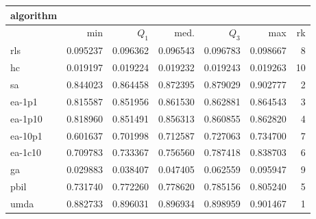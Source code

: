\begin{tabular}{@{}l*{5}{>{{}}N{1}{3}}>{{}}N{2}{0}@{}}
\toprule
{algorithm} &  \\
\midrule
& {min} & {$Q_1$} & {med.} & {$Q_3$} & {max} & {rk}\\
\midrule
rls & 0.095237 & 0.096362 & 0.096543 & 0.096783 & 0.098667 & 8\\
hc & 0.019197 & 0.019224 & 0.019232 & 0.019243 & 0.019263 & 10\\
sa & 0.844023 & 0.864458 & 0.872395 & 0.879029 & {\color{blue}} 0.902777 & 2\\
ea-1p1 & 0.815587 & 0.851956 & 0.861530 & 0.862881 & 0.864543 & 3\\
ea-1p10 & 0.818960 & 0.851491 & 0.856313 & 0.860855 & 0.862820 & 4\\
ea-10p1 & 0.601637 & 0.701998 & 0.712587 & 0.727063 & 0.734700 & 7\\
ea-1c10 & 0.709783 & 0.733367 & 0.756560 & 0.787418 & 0.838703 & 6\\
ga & 0.029883 & 0.038407 & 0.047405 & 0.062559 & 0.095947 & 9\\
pbil & 0.731740 & 0.772260 & 0.778620 & 0.785156 & 0.805240 & 5\\
umda & {\color{blue}} 0.882733 & {\color{blue}} 0.896031 & {\color{blue}} 0.896934 & {\color{blue}} 0.898959 & 0.901467 & 1\\
\bottomrule
\end{tabular}
